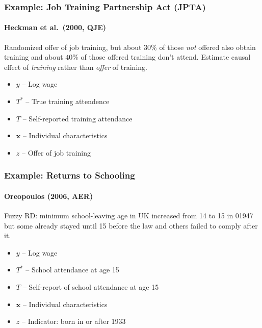 \documentclass{beamer}
\begin{document}
%
\begin{frame}
  \frametitle{Example: Job Training Partnership Act (JPTA)}
\framesubtitle{Heckman et al.\ (2000, QJE)}
Randomized offer of job training, but about $30\%$ of those \emph{not} offered also obtain training and about $40\%$ of those offered training don't attend. Estimate causal effect of \emph{training} rather than \emph{offer} of training.

\begin{itemize}
  \item $y$ -- Log wage 
  \item $T^*$ -- True training attendence
  \item $T$ -- Self-reported training attendance
  \item $\mathbf{x}$ -- Individual characteristics
  \item $z$ -- Offer of job training
\end{itemize}
   
\end{frame}
\begin{frame}
  \frametitle{Example: Returns to Schooling} 
\framesubtitle{Oreopoulos (2006, AER)}
Fuzzy RD: minimum school-leaving age in UK increased from 14 to 15 in 01947 but some already stayed until 15 before the law and others failed to comply after it.
\begin{itemize}
  \item $y$ -- Log wage 
  \item $T^*$ -- School attendance at age 15
  \item $T$ -- Self-report of school attendance at age 15
  \item $\mathbf{x}$ -- Individual characteristics
  \item $z$ -- Indicator: born in or after 1933
\end{itemize}
   
\end{frame}
\end{document}
